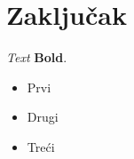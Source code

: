 \section{Zaključak}

\textit{Text} \textbf{Bold}.
\begin{itemize}
	\item{Prvi}
	\item{Drugi}
	\item{Treći}
\end{itemize}